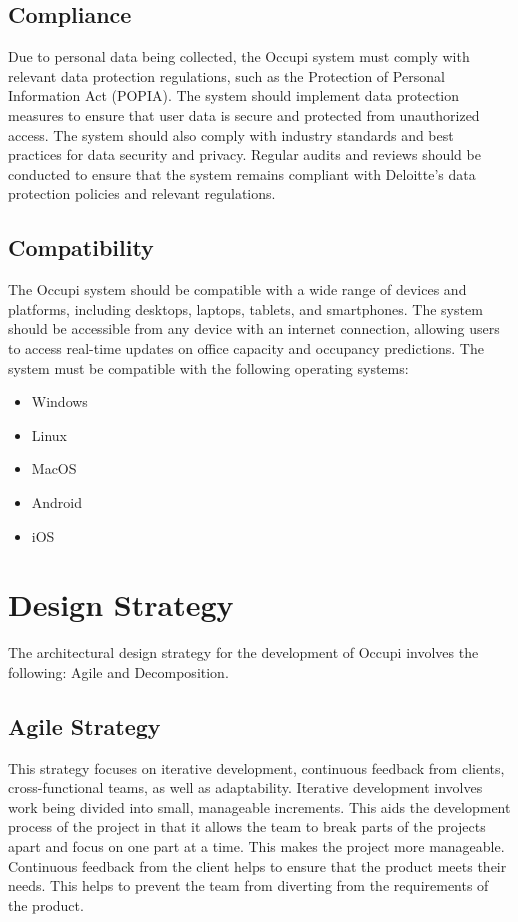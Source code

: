 \documentclass[11pt,a4paper]{article}
\begin{document}
\subsection*{Compliance}
Due to personal data being collected, the Occupi system must comply with relevant data protection regulations, such as the Protection of Personal Information Act (POPIA). The system should implement data protection measures to ensure that user data is secure and protected from unauthorized access. The system should also comply with industry standards and best practices for data security and privacy. Regular audits and reviews should be conducted to ensure that the system remains compliant with Deloitte’s data protection policies and relevant regulations.

\subsection*{Compatibility}
The Occupi system should be compatible with a wide range of devices and platforms, including desktops, laptops, tablets, and smartphones. The system should be accessible from any device with an internet connection, allowing users to access real-time updates on office capacity and occupancy predictions. The system must be compatible with the following operating systems:
\begin{itemize}
    \item Windows
    \item Linux
    \item MacOS
    \item Android
    \item iOS
\end{itemize}

\pagebreak

\section*{Design Strategy}
The architectural design strategy for the development of Occupi involves the following: Agile and Decomposition.

\subsection*{Agile Strategy}
This strategy focuses on iterative development, continuous feedback from clients, cross-functional teams, as well as adaptability. Iterative development involves work being divided into small, manageable increments. This aids the development process of the project in that it allows the team to break parts of the projects apart and focus on one part at a time. This makes the project more manageable. Continuous feedback from the client helps to ensure that the product meets their needs. This helps to prevent the team from diverting from the requirements of the product.
\end{document}
